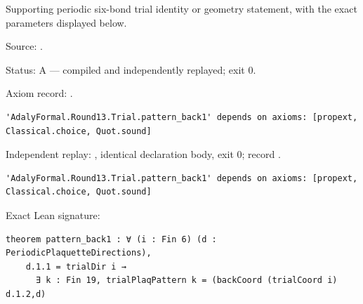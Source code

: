 \begin{theorem}[bp-386]
\label{bp-386}
\leanok
Supporting periodic six-bond trial identity or geometry statement, with the exact parameters displayed below.

\par Source: \texttt{}.
\par Status: A — compiled and independently replayed; exit 0.
\par Axiom record: \texttt{}.
\begin{verbatim}
'AdalyFormal.Round13.Trial.pattern_back1' depends on axioms: [propext, Classical.choice, Quot.sound]
\end{verbatim}
\par Independent replay: \texttt{}, identical declaration body, exit 0; record \texttt{}.
\begin{verbatim}
'AdalyFormal.Round13.Trial.pattern_back1' depends on axioms: [propext, Classical.choice, Quot.sound]
\end{verbatim}
\par Exact Lean signature:
\begin{verbatim}
theorem pattern_back1 : ∀ (i : Fin 6) (d : PeriodicPlaquetteDirections),
    d.1.1 = trialDir i →
      ∃ k : Fin 19, trialPlaqPattern k = (backCoord (trialCoord i) d.1.2,d)
\end{verbatim}
\end{theorem}

